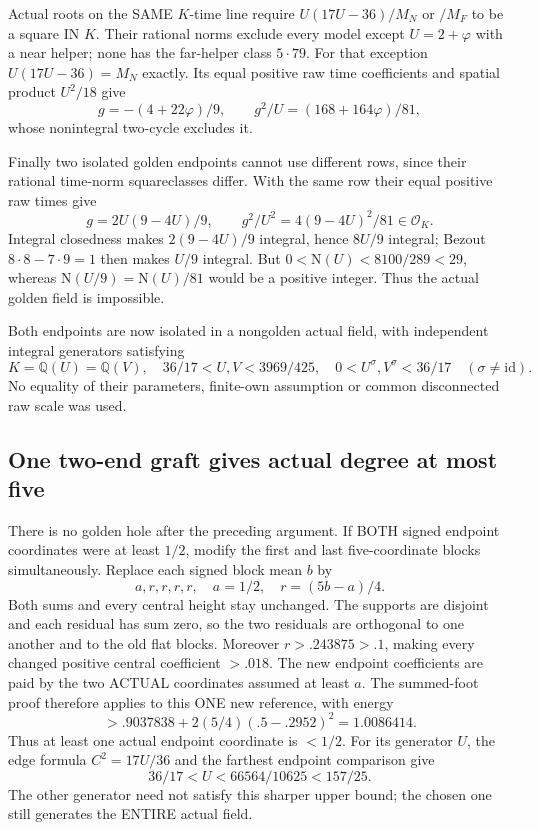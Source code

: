 \documentclass[11pt]{article}
\begin{document}
Actual roots on the SAME \(K\)-time line require
\(U(17U-36)/M_N\) or \(/M_F\) to be a square IN \(K\).
Their rational norms exclude every model except \(U=2+\varphi\)
with a near helper; none has the far-helper class \(5\cdot79\).
For that exception \(U(17U-36)=M_N\) exactly.
Its equal positive raw time coefficients and spatial product
\(U^2/18\) give
\[
 g=-(4+22\varphi)/9,\qquad
 g^2/U=(168+164\varphi)/81,
\]
whose nonintegral two-cycle excludes it.

Finally two isolated golden endpoints cannot use different rows,
since their rational time-norm squareclasses differ.
With the same row their equal positive raw times give
\[
 g=2U(9-4U)/9,\qquad g^2/U^2=4(9-4U)^2/81\in\mathcal O_K .
\]
Integral closedness makes \(2(9-4U)/9\) integral, hence
\(8U/9\) integral; Bezout \(8\cdot8-7\cdot9=1\)
then makes \(U/9\) integral.
But \(0<\mathrm N(U)<8100/289<29\), whereas
\(\mathrm N(U/9)=\mathrm N(U)/81\) would be a positive integer.
Thus the actual golden field is impossible.

Both endpoints are now isolated in a nongolden actual field,
with independent integral generators satisfying
\[
 K=\mathbb Q(U)=\mathbb Q(V),\quad
 36/17<U,V<3969/425,\quad
 0<U^\sigma,V^\sigma<36/17\quad(\sigma\ne\mathrm{id}).
\tag{A17isolated}\label{eq:arithA17isolated}
\]
No equality of their parameters, finite-own assumption or common
disconnected raw scale was used.

\subsection{One two-end graft gives actual degree at most five}
\label{app:arithA17degree}

There is no golden hole after the preceding argument.
If BOTH signed endpoint coordinates were at least \(1/2\),
modify the first and last five-coordinate blocks simultaneously.
Replace each signed block mean \(b\) by
\[
             a,r,r,r,r,\quad a=1/2,\quad r=(5b-a)/4 .
\]
Both sums and every central height stay unchanged.
The supports are disjoint and each residual has sum zero,
so the two residuals are orthogonal to one another and to the
old flat blocks.
Moreover \(r>.243875>.1\), making every changed positive
central coefficient \(>.018\).
The new endpoint coefficients are paid by the two ACTUAL
coordinates assumed at least \(a\).
The summed-foot proof therefore applies to this ONE new reference,
with energy
\[
 >.9037838+2(5/4)(.5-.2952)^2
 =1.0086414 .
\]
Thus at least one actual endpoint coordinate is \(<1/2\).
For its generator \(U\), the edge formula
\(C^2=17U/36\) and the farthest endpoint comparison give
\[
                  36/17<U<66564/10625<157/25.
\tag{A17shortU}\label{eq:arithA17shortU}
\]
The other generator need not satisfy this sharper upper bound;
the chosen one still generates the ENTIRE actual field.
\end{document}
